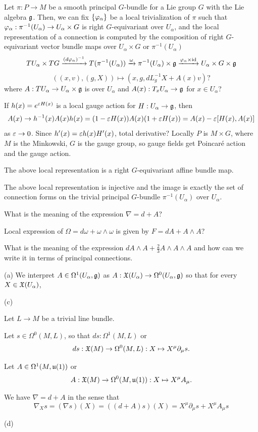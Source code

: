 \documentclass{../../large}
\begin{document}
\begin{prb}
Let $\pi:P\to M$ be a smooth principal $G$-bundle for a Lie group $G$ with the Lie algebra $\mathfrak{g}$.
Then, we can fix $\{\varphi_\alpha\}$ be a local trivialization of $\pi$ such that $\varphi_\alpha:\pi^{-1}(U_\alpha)\to U_\alpha\times G$ is right $G$-equivariant over $U_\alpha$, and the local representation of a connection is computed by the composition of right $G$-equivariant vector bundle maps over $U_\alpha\times G$ or $\pi^{-1}(U_\alpha)$
\[TU_\alpha\times TG\xrightarrow{(d\varphi_\alpha)^{-1}}T(\pi^{-1}(U_\alpha))\xrightarrow{\omega}\pi^{-1}(U_\alpha)\times\mathfrak{g}\xrightarrow{\varphi_\alpha\times\operatorname{id}}U_\alpha\times G\times\mathfrak{g}\]
\[((x,v),(g,X))\mapsto(x,g, dL_g^{-1}X+A(x)v)?\]
where $A:TU_\alpha\to U_\alpha\times\mathfrak{g}$ is over $U_\alpha$ and $A(x):T_xU_\alpha\to\mathfrak{g}$ for $x\in U_\alpha$?

If $h(x)=e^{\varepsilon H(x)}$ is a local gauge action for $H:U_\alpha\to\mathfrak{g}$, then
\[A(x)\to h^{-1}(x)A(x)h(x)=(1-\varepsilon H(x))A(x)(1+\varepsilon H(x))=A(x)-\varepsilon[H(x),A(x)]\]
as $\varepsilon\to0$.
Since $h'(x)=\varepsilon h(x)H'(x)$, total derivative?
Locally $P$ is $M\times G$, where $M$ is the Minkowski, $G$ is the gauge group, so gauge fields get Poincar\'e action and the gauge action.


\begin{parts}
\item The above local representation is a right $G$-equivariant affine bundle map.
\item The above local representation is injective and the image is exactly the set of connection forms on the trivial principal $G$-bundle $\pi^{-1}(U_\alpha)$ over $U_\alpha$.
\item What is the meaning of the expression $\nabla=d+A$?
\item Local expression of $\Omega=d\omega+\omega\wedge\omega$ is given by $F=dA+A\wedge A$?
\item What is the meaning of the expression $dA\wedge A+\frac23A\wedge A\wedge A$ and how can we write it in terms of principal connections.
\end{parts}
\end{prb}
\begin{pf}
(a)
We interpret $A\in\Omega^1(U_\alpha,\mathfrak{g})$ as $A:\mathfrak{X}(U_\alpha)\to\Omega^0(U_\alpha,\mathfrak{g})$ so that for every $X\in\mathfrak{X}(U_\alpha)$,


(c)

Let $L\to M$ be a trivial line bundle.

Let $s\in\Omega^0(M,L)$, so that $ds:\Omega^1(M,L)$ or
\[ds:\mathfrak{X}(M)\to\Omega^0(M,L):X\mapsto X^\mu\partial_\mu s.\]

Let $A\in\Omega^1(M,\mathfrak{u}(1))$ or
\[A:\mathfrak{X}(M)\to\Omega^0(M,\mathfrak{u}(1)):X\mapsto X^\mu A_\mu.\]

We have $\nabla=d+A$ in the sense that
\[\nabla_Xs=(\nabla s)(X)=((d+A)s)(X)=X^\mu\partial_\mu s+X^\mu A_\mu s\]


(d)



\end{pf}
\end{document}
